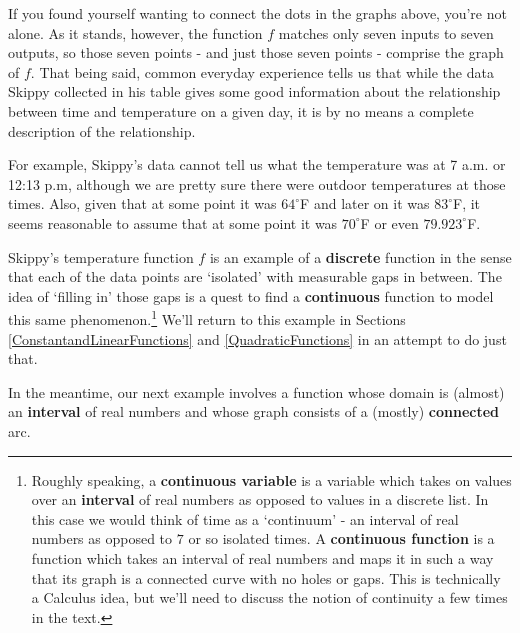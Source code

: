\documentclass{ximera}
\begin{document}
\medskip

\label{firsttimewebreaktheaxis}

If you found yourself wanting to connect the dots in the graphs above, you're not alone.  As it stands, however, the function $f$ matches only seven inputs to seven outputs, so those seven points - and just those seven points - comprise the graph of $f$.  That being said, common everyday experience tells us that while the data Skippy collected in his table gives some good information about the relationship between time and temperature on a given day, it is by no means a complete description of the relationship.  

\medskip

For example, Skippy's data cannot tell us what the temperature was at 7 a.m. or 12:13 p.m, although we are pretty sure there were outdoor temperatures at those times.  Also, given that at some point it was $64^{\circ}$F and later on it was $83^{\circ}$F, it seems reasonable to assume that at some point it was $70^{\circ}$F or even $79.923^{\circ}$F.  

\medskip

Skippy's temperature function $f$ is an example of a  \textbf{discrete} function in the sense that each of the data points are `isolated' with measurable gaps in between.  The idea of `filling in' those gaps is a quest to find a  \textbf{continuous} function to model this same phenomenon.\footnote{Roughly speaking, a \textbf{continuous variable} is a variable which takes on values over an \textbf{interval} of real numbers as opposed to values in a discrete list. In this case we would think of time as a `continuum' - an interval of real numbers as opposed to $7$ or so isolated times.  A \textbf{continuous function} is a function which takes an interval of real numbers and maps it in such a way that its graph is a connected curve with no holes or gaps. This is technically a Calculus idea, but we'll need to discuss the notion of continuity a few times in the text.} We'll return to this example in Sections \ref{ConstantandLinearFunctions} and \ref{QuadraticFunctions} in an attempt to do just that. 

\medskip

In the meantime, our next example involves a function whose domain is (almost) an \textbf{interval} of real numbers and whose graph consists of a (mostly) \textbf{connected} arc.

\pagebreak
\end{document}
